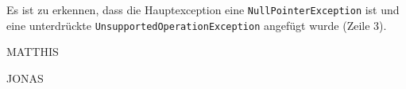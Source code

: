 \documentclass[times, 10pt,twocolumn]{article}
\begin{document}
Es ist zu erkennen, dass die Hauptexception eine \texttt{NullPointerException} ist und eine unterdrückte 
\texttt{UnsupportedOperationException} angefügt wurde (Zeile 3).

MATTHIS

JONAS


% 
% 
% 
% 
% 
% 
% 
% 




\jDocIndex
\end{document}
